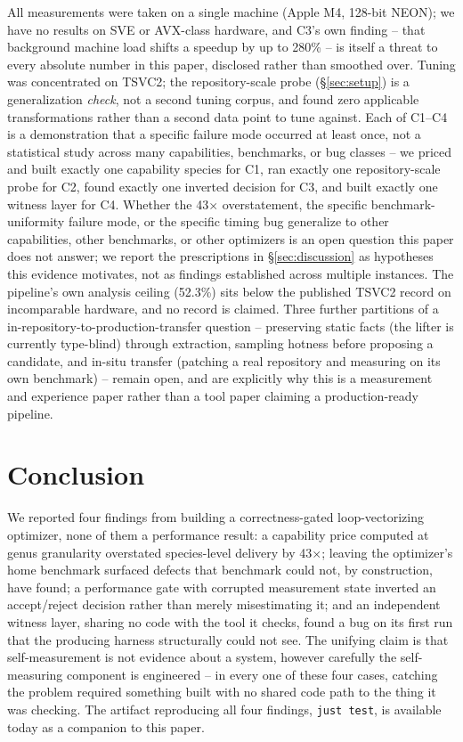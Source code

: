 \documentclass[sigconf,review,anonymous]{acmart}
\begin{document}
All measurements were taken on a single machine (Apple M4, 128-bit NEON); we
have no results on SVE or AVX-class hardware, and C3's own finding --
that background machine load shifts a speedup by up to 280\% -- is itself a
threat to every absolute number in this paper, disclosed rather than
smoothed over. Tuning was concentrated on TSVC2; the repository-scale probe
(\S\ref{sec:setup}) is a generalization \emph{check}, not a second tuning
corpus, and found zero applicable transformations rather than a second data
point to tune against. Each of C1--C4 is a demonstration that a specific
failure mode occurred at least once, not a statistical study across many
capabilities, benchmarks, or bug classes -- we priced and built exactly one
capability species for C1, ran exactly one repository-scale probe for C2,
found exactly one inverted decision for C3, and built exactly one witness
layer for C4. Whether the 43$\times$ overstatement, the specific
benchmark-uniformity failure mode, or the specific timing bug generalize to
other capabilities, other benchmarks, or other optimizers is an open
question this paper does not answer; we report the prescriptions in
\S\ref{sec:discussion} as hypotheses this evidence motivates, not as
findings established across multiple instances. The pipeline's own analysis
ceiling (52.3\%) sits below the published TSVC2 record on incomparable
hardware, and no record is claimed. Three further partitions of a
in-repository-to-production-transfer question -- preserving static facts
(the lifter is currently type-blind) through extraction, sampling hotness
before proposing a candidate, and in-situ transfer (patching a real
repository and measuring on its own benchmark) -- remain open, and are
explicitly why this is a measurement and experience paper rather than a
tool paper claiming a production-ready pipeline.

\section{Conclusion}

We reported four findings from building a correctness-gated loop-vectorizing
optimizer, none of them a performance result: a capability price computed at
genus granularity overstated species-level delivery by 43$\times$; leaving
the optimizer's home benchmark surfaced defects that benchmark could not, by
construction, have found; a performance gate with corrupted measurement
state inverted an accept/reject decision rather than merely misestimating
it; and an independent witness layer, sharing no code with the tool it
checks, found a bug on its first run that the producing harness structurally
could not see. The unifying claim is that self-measurement is not evidence
about a system, however carefully the self-measuring component is
engineered -- in every one of these four cases, catching the problem
required something built with no shared code path to the thing it was
checking. The artifact reproducing all four findings,
\texttt{just test}, is available today as a companion to this paper.
\end{document}
